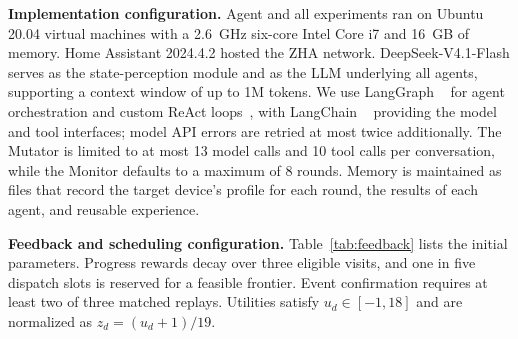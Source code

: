 \documentclass[10pt,journal,compsoc]{IEEEtran}
\newcommand{\parab}[1]{\vspace{0.04in}\noindent\textbf{#1}}
\begin{document}
\parab{Implementation configuration.}\label{sec:implementation}
Agent and all experiments ran on Ubuntu 20.04 virtual machines with a 2.6~GHz six-core Intel Core i7 and 16~GB of memory. Home Assistant 2024.4.2 hosted the ZHA network. DeepSeek-V4.1-Flash serves as the state-perception module and as the LLM underlying all agents, supporting a context window of up to 1M tokens. We use LangGraph ~\cite{langgraph} for agent orchestration and custom ReAct loops~\cite{react}, with LangChain ~\cite{langchain} providing the model and tool interfaces; model API errors are retried at most twice additionally. The Mutator is limited to at most 13 model calls and 10 tool calls per conversation, while the Monitor defaults to a maximum of 8 rounds. Memory is maintained as files that record the target device's profile for each round, the results of each agent, and reusable experience.


\parab{Feedback and scheduling configuration.}
Table~\ref{tab:feedback} lists the initial parameters. Progress rewards decay over three eligible visits, and one in five dispatch slots is reserved for a feasible frontier. Event confirmation requires at least two of three matched replays. Utilities satisfy $u_d\in[-1,18]$ and are normalized as $z_d=(u_d+1)/19$.

\end{document}
